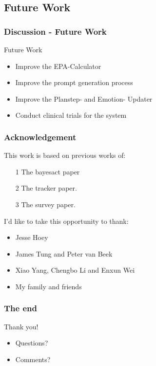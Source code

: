 \documentclass{beamer}
\begin{document}
\subsection{Future Work}
\begin{frame}
\frametitle{Discussion - Future Work}
Future Work
\begin{itemize}
\item{Improve the EPA-Calculator}
\item{Improve the prompt generation process}
\item{Improve the Planstep- and Emotion- Updater}
\item{Conduct clinical trials for the system}
\end{itemize}
\end{frame}

\begin{frame}
\frametitle{Acknowledgement}
This work is based on previous works of:
\begin{itemize}
\item [1] The bayesact paper
\item [2] The tracker paper.
\item [3] The survey paper.
\end{itemize}
\vspace{0.3cm}
I'd like to take this opportunity to thank:
\begin{itemize}
\item Jesse Hoey
\item James Tung and Peter van Beek
\item Xiao Yang, Chengbo Li and Enxun Wei
\item My family and friends
\end{itemize}
\end{frame}
\begin{frame}
\frametitle{The end}
\Huge{\centerline{Thank you!}}   
\fontsize{5mm}{4mm}
\begin{itemize}
\item Questions?
\item Comments?
\end{itemize}
\end{frame}

\end{document}
